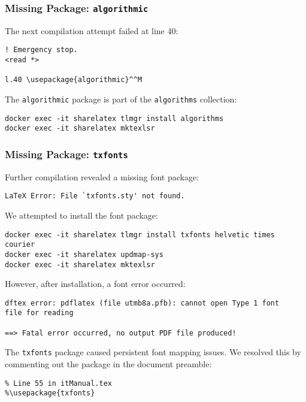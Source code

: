 \subsubsection{Missing Package: \texttt{algorithmic}}

The next compilation attempt failed at line 40:

\begin{verbatim}
! Emergency stop.
<read *> 
         
l.40 \usepackage{algorithmic}^^M
\end{verbatim}

The \verb|algorithmic| package is part of the \verb|algorithms| collection:

\begin{verbatim}
docker exec -it sharelatex tlmgr install algorithms
docker exec -it sharelatex mktexlsr
\end{verbatim}

\subsubsection{Missing Package: \texttt{txfonts}}

Further compilation revealed a missing font package:

\begin{verbatim}
LaTeX Error: File `txfonts.sty' not found.
\end{verbatim}

We attempted to install the font package:

\begin{verbatim}
docker exec -it sharelatex tlmgr install txfonts helvetic times courier
docker exec -it sharelatex updmap-sys
docker exec -it sharelatex mktexlsr
\end{verbatim}

However, after installation, a font error occurred:

\begin{verbatim}
dftex error: pdflatex (file utmb8a.pfb): cannot open Type 1 font
file for reading

==> Fatal error occurred, no output PDF file produced!
\end{verbatim}

The \verb|txfonts| package caused persistent font mapping issues. We resolved this by commenting out the package in the document preamble:

\begin{verbatim}
% Line 55 in itManual.tex
%\usepackage{txfonts}
\end{verbatim}

